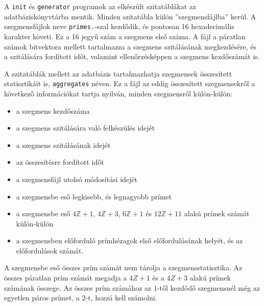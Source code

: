 A \texttt{init} és \texttt{generator} programok az elkészült szitatáblákat az adatbáziskönyvtárba mentik.
Minden szitatábla külön ''szegmensfájlba'' kerül.
A szegmensfájlok neve \texttt{primes.}-szal kezdődik, és pontosan 16 hexadecimális karakter követi.
Ez a 16 jegyű szám a szegmens első száma.
A fájl a páratlan számok bitvektora mellett tartalmazza a szegmens szitálásának megkezdésére, és a szitálására fordított időt, valamint ellenőrzésképpen a szegmens kezdőszámát is.

A szitatáblák mellett az adatbázis tartalmazhatja szegmensek összesített statisztikáit is, \texttt{aggregates} néven.
Ez a fájl az eddig összesített szegmensekről a következő információkat tartja nyilván, minden szegmensről külön-külön:
\begin{itemize}
\item a szegmens kezdőszáma
\item a szegmens szitálására való felkészülés idejét
\item a szegmens szitálásának idejét
\item az összesítésre fordított időt
\item a szegmensfájl utolsó módosítási idejét
\item a szegmensbe eső legkisebb, és legnagyobb prímet
\item a szegmensbe eső $4\mathbb{Z}+1$, $4\mathbb{Z}+3$, $6\mathbb{Z}+1$ és $12\mathbb{Z}+11$ alakú prímek számát külön-külön
\item a szegmensben előforduló prímhézagok első előfordulásának helyét, és az előfordulások számát.
\end{itemize}
A szegmensbe eső összes prím számát nem tárolja a szegmensstatisztika.
Az összes páratlan prím számát megadja a $4Z+1$ és a $4Z+3$ alakú prímek számának összege.
Az összes prím számához az $1$-től kezdődő szegmensnél még az egyetlen páros prímet, a $2$-t, hozzá kell számolni.

